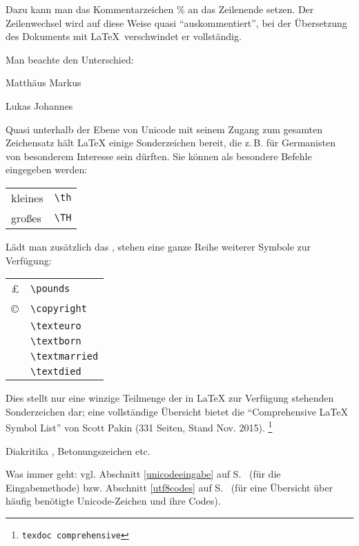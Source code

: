 Dazu kann man das Kommentarzeichen \% an das Zeilenende setzen. Der Zeilenwechsel wird auf diese 
Weise quasi \enquote{auskommentiert}, bei der Übersetzung des Dokuments mit \LaTeX\
verschwindet er vollständig.

Man beachte den Unterschied:

\begin{lfgwexample}{}
 Matthäus
 Markus
 
 Lukas%
 Johannes
\end{lfgwexample}



Quasi unterhalb der Ebene von Unicode mit seinem Zugang zum gesamten Zeichensatz hält 
\LaTeX{} einige Sonderzeichen bereit, die z.\,B. für Germanisten von besonderem Interesse
sein dürften. Sie können als besondere Befehle eingegeben werden:

\begin{tabular}{ll}
 kleines \th &  \lstinline/\th/ \\
 großes \TH &   \lstinline/\TH/ \\
\end{tabular}

Lädt man zusätzlich das , stehen eine ganze Reihe weiterer Symbole
zur Verfügung:

\begin{tabular}{ll}
 \pounds      & \lstinline/\pounds/ \\
 \copyright   & \lstinline/\copyright/ \\
 \texteuro    & \lstinline/\texteuro/ \\
 \textborn    & \lstinline/\textborn/ \\
 \textmarried & \lstinline/\textmarried/ \\
 \textdied    & \lstinline/\textdied/ \\
 \end{tabular}
 
Dies stellt nur eine winzige Teilmenge der in \LaTeX{} zur Verfügung stehenden Sonderzeichen dar;
eine vollständige Übersicht bietet die \enquote{Comprehensive \LaTeX{} Symbol List} von
Scott Pakin (331 Seiten, Stand Nov. 2015).
\footnote{\lstinline/texdoc comprehensive/}



Diakritika ,
Betonungszeichen etc.



Was immer geht: 
vgl. Abschnitt \ref{unicodeeingabe} auf S.~\pageref{unicodeeingabe} 
(für die Eingabemethode)
bzw. Abschnitt \ref{utf8codes} auf S.~\pageref{utf8codes} 
(für eine Übersicht über häufig benötigte Unicode-Zeichen und ihre Codes).



